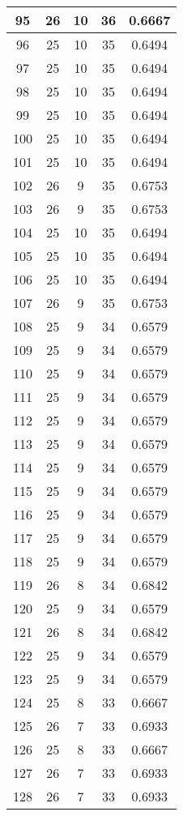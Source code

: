 \documentclass[letterpaper, 12pt]{article}
\begin{document}
\begin{longtable}{|c|c|c|c|c|}
95 & 26 & 10 & 36 & 0.6667 \\
\hline
96 & 25 & 10 & 35 & 0.6494 \\
\hline
97 & 25 & 10 & 35 & 0.6494 \\
\hline
98 & 25 & 10 & 35 & 0.6494 \\
\hline
99 & 25 & 10 & 35 & 0.6494 \\
\hline
100 & 25 & 10 & 35 & 0.6494 \\
\hline
101 & 25 & 10 & 35 & 0.6494 \\
\hline
102 & 26 & 9 & 35 & 0.6753 \\
\hline
103 & 26 & 9 & 35 & 0.6753 \\
\hline
104 & 25 & 10 & 35 & 0.6494 \\
\hline
105 & 25 & 10 & 35 & 0.6494 \\
\hline
106 & 25 & 10 & 35 & 0.6494 \\
\hline
107 & 26 & 9 & 35 & 0.6753 \\
\hline
108 & 25 & 9 & 34 & 0.6579 \\
\hline
109 & 25 & 9 & 34 & 0.6579 \\
\hline
110 & 25 & 9 & 34 & 0.6579 \\
\hline
111 & 25 & 9 & 34 & 0.6579 \\
\hline
112 & 25 & 9 & 34 & 0.6579 \\
\hline
113 & 25 & 9 & 34 & 0.6579 \\
\hline
114 & 25 & 9 & 34 & 0.6579 \\
\hline
115 & 25 & 9 & 34 & 0.6579 \\
\hline
116 & 25 & 9 & 34 & 0.6579 \\
\hline
117 & 25 & 9 & 34 & 0.6579 \\
\hline
118 & 25 & 9 & 34 & 0.6579 \\
\hline
119 & 26 & 8 & 34 & 0.6842 \\
\hline
120 & 25 & 9 & 34 & 0.6579 \\
\hline
121 & 26 & 8 & 34 & 0.6842 \\
\hline
122 & 25 & 9 & 34 & 0.6579 \\
\hline
123 & 25 & 9 & 34 & 0.6579 \\
\hline
124 & 25 & 8 & 33 & 0.6667 \\
\hline
125 & 26 & 7 & 33 & 0.6933 \\
\hline
126 & 25 & 8 & 33 & 0.6667 \\
\hline
127 & 26 & 7 & 33 & 0.6933 \\
\hline
128 & 26 & 7 & 33 & 0.6933 \\

\end{longtable}
\end{document}
